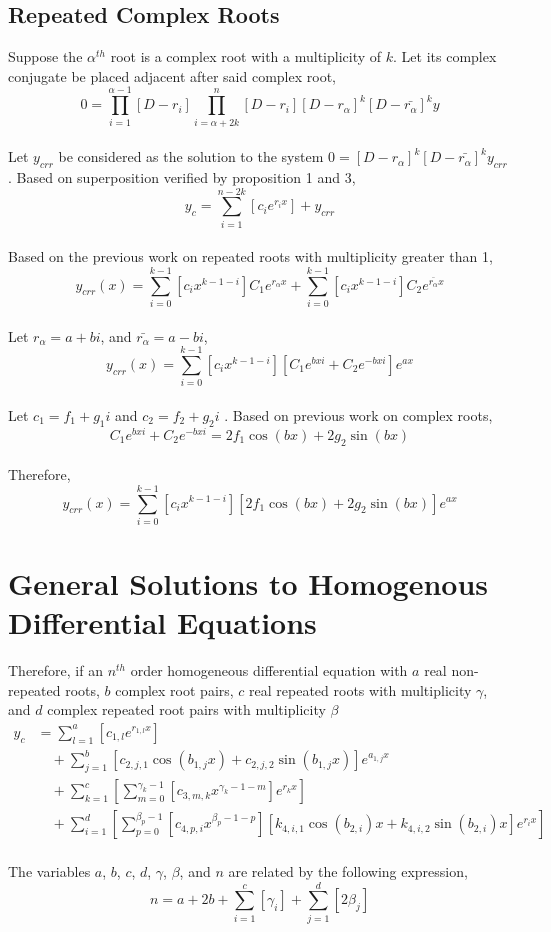 \subsection{Repeated Complex Roots}
\begin{comment}
\end{comment}
Suppose the $\alpha^{th}$ root is a complex root with a multiplicity of $k$. Let its complex conjugate be placed adjacent after said complex root,
$$0 = \prod_{i = 1}^{\alpha - 1}\left[D - r_i\right]\prod_{i = \alpha + 2k}^{n}\left[D - r_i\right]\left[D - r_{\alpha}\right]^{k}\left[D - \bar{r_{\alpha}}\right]^{k}y$$
\\Let $y_{crr}$ be considered as the solution to the system $0 = \left[D - r_{\alpha}\right]^{k}\left[D - \bar{r_{\alpha}}\right]^{k}y_{crr}$ . Based on superposition verified by proposition 1 and 3, 
$$y_c = \sum_{i = 1}^{n - 2k}\left[c_i e^{r_i x}\right] + y_{crr}$$
\\Based on the previous work on repeated roots with multiplicity greater than 1,
$$y_{crr}(x) = \sum_{i = 0}^{k - 1}\left[c_i x ^{k - 1 - i} \right] C_1 e^{r_\alpha x} + \sum_{i = 0}^{k - 1}\left[c_i x ^{k - 1 - i} \right] C_2 e^{\bar{r_\alpha} x}$$ 
\\Let $r_{\alpha} = a + bi$, and $\bar{r_\alpha} = a - bi$, 
$$y_{crr}(x) = \sum_{i = 0}^{k - 1}\left[c_i x ^{k - 1 - i} \right] [C_1 e^{bxi} + C_2 e^{-bxi}] e^{ax}$$
\\Let $c_{1} = f_1 + g_1 i$ and $c_{2} = f_2 + g_2 i$ . Based on previous work on complex roots,
$$C_1 e^{bxi} + C_2 e^{- bxi} = 2 f_1\cos{(bx)} + 2 g_2\sin{(bx)}$$
\\Therefore,
$$y_{crr}(x) = \sum_{i = 0}^{k - 1}\left[c_i x ^{k - 1 - i} \right] [2 f_1\cos{(bx)} + 2 g_2\sin{(bx)}] e^{ax}$$
\section{General Solutions to Homogenous Differential Equations}
\begin{comment}
\end{comment}
Therefore, if an $n^{th}$ order homogeneous differential equation with $a$ real non-repeated roots, $b$ complex root pairs, $c$ real repeated roots with multiplicity $\gamma$, and $d$ complex repeated root pairs with multiplicity $\beta$
\begin{align*}
y_c  &= \sum_{l =1}^{a}\left[c_{1,l}e^{r_{1,l}x}\right]\\ 
&\quad + \sum_{j =1}^{b}[c_{2,j,1} \cos{(b_{1,j} x)} + c_{2,j,2} \sin{(b_{1,j} x)}]e^{a_{1,j} x}\\ 
&\quad + \sum_{k =1}^{c}\left[\sum_{m = 0}^{\gamma_k - 1}\left[c_{3,m,k} x ^{\gamma_k - 1 - m} \right] e^{r_{k} x}\right]\\
&\quad + \sum_{i =1}^{d}\left[\sum_{p = 0}^{\beta_{p} - 1}\left[c_{4,p,i} x ^{\beta_{p} - 1 - p} \right][k_{4,i,1}\cos{(b_{2,i})x} + k_{4,i,2}\sin{(b_{2,i})x}] e^{r_{i} x}\right]
\end{align*}
\\The variables $a$, $b$, $c$, $d$, $\gamma$, $\beta$, and $n$ are related by the following expression,
$$n = a + 2b + \sum_{i = 1}^{c}[\gamma_{i}] + \sum_{j = 1}^{d}[2\beta_{j}]$$

